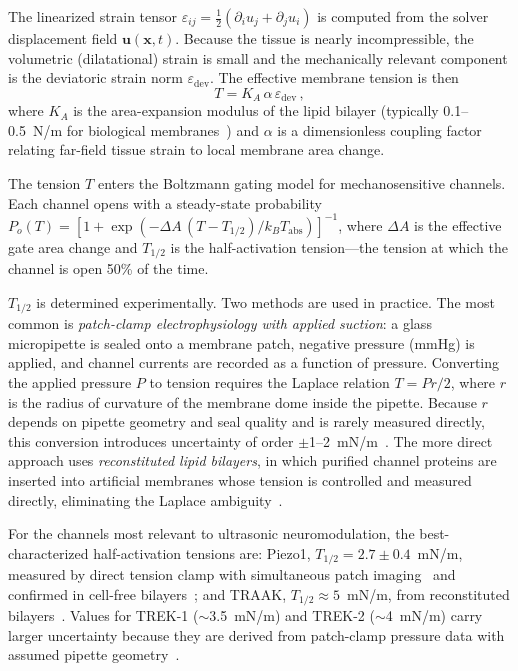 \documentclass[11pt]{article}
\begin{document}
The linearized strain tensor $\varepsilon_{ij} = \tfrac{1}{2}(\partial_i u_j + \partial_j u_i)$
is computed from the solver displacement field $\bm{u}(\bm{x},t)$.  Because
the tissue is nearly incompressible, the volumetric (dilatational) strain is
small and the mechanically relevant component is the deviatoric strain norm
$\varepsilon_{\mathrm{dev}}$.  The effective membrane tension is then
\begin{equation}
    T = K_A \,\alpha\, \varepsilon_{\mathrm{dev}} \,,
    \label{eq:tension}
\end{equation}
where $K_A$ is the area-expansion modulus of the lipid bilayer
(typically 0.1--0.5~N/m for biological
membranes~\cite{rawicz2000effect}) and $\alpha$ is a dimensionless
coupling factor relating far-field tissue strain to local membrane area
change.

The tension $T$ enters the Boltzmann gating model for mechanosensitive
channels.  Each channel opens with a steady-state probability
$P_o(T) = [1 + \exp(-\Delta A\,(T - T_{1/2})/k_BT_{\mathrm{abs}})]^{-1}$,
where $\Delta A$ is the effective gate area change and $T_{1/2}$ is the
half-activation tension---the tension at which the channel is open 50\%
of the time.

$T_{1/2}$ is determined experimentally.  Two methods are used in practice.
The most common is \emph{patch-clamp electrophysiology with applied suction}:
a glass micropipette is sealed onto a membrane patch, negative pressure
(mmHg) is applied, and channel currents are recorded as a function of
pressure.  Converting the applied pressure $P$ to tension requires the
Laplace relation $T = Pr/2$, where $r$ is the radius of curvature of the
membrane dome inside the pipette.  Because $r$ depends on pipette geometry
and seal quality and is rarely measured directly, this conversion introduces
uncertainty of order $\pm$1--2~mN/m~\cite{lewis2015mechanical}.  The more
direct approach uses \emph{reconstituted lipid bilayers}, in which purified
channel proteins are inserted into artificial membranes whose tension is
controlled and measured directly, eliminating the Laplace
ambiguity~\cite{syeda2016piezo,brohawn2014mechanosensitivity}.

For the channels most relevant to ultrasonic neuromodulation, the best-characterized
half-activation tensions are: Piezo1, $T_{1/2} = 2.7 \pm 0.4$~mN/m, measured by
direct tension clamp with simultaneous patch imaging~\cite{lewis2015mechanical}
and confirmed in cell-free bilayers~\cite{syeda2016piezo}; and TRAAK,
$T_{1/2} \approx 5$~mN/m, from reconstituted
bilayers~\cite{brohawn2014mechanosensitivity}.  Values for TREK-1
($\sim$3.5~mN/m) and TREK-2 ($\sim$4~mN/m) carry larger uncertainty because
they are derived from patch-clamp pressure data with assumed pipette
geometry~\cite{patel1998lipid,bang2000trek2}.
\end{document}
